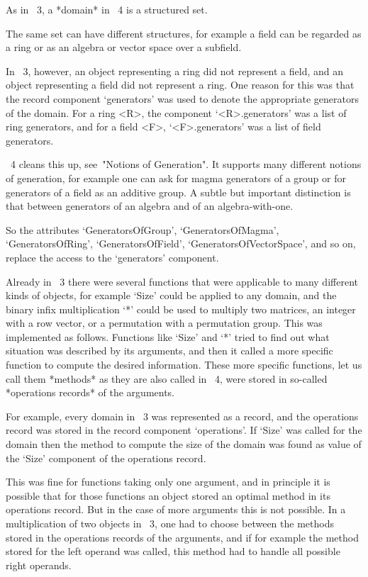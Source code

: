 As in {\GAP}~3, a *domain* in {\GAP}~4 is a structured set.

The same set can have different structures, for example a field can be
regarded as a ring or as an algebra or vector space over a subfield.

In {\GAP}~3, however, an object representing a ring did not represent
a field, and an object representing a field did not represent a ring.
One reason for this was that the record component `generators' was
used to denote the appropriate generators of the domain.  For a ring
<R>, the component `<R>.generators' was a list of ring generators, and
for a field <F>, `<F>.generators' was a list of field generators.

{\GAP}~4 cleans this up, see~"Notions of Generation".  It supports
many different notions of generation, for example one can ask for
magma generators of a group or for generators of a field as an additive
group.  A subtle but important distinction is that between generators
of an algebra and of an algebra-with-one.

So the attributes `GeneratorsOfGroup', `GeneratorsOfMagma',
`GeneratorsOfRing', `GeneratorsOfField', `GeneratorsOfVectorSpace',
and so on, replace the access to the `generators' component.



Already in {\GAP}~3 there were several functions that were applicable
to many different kinds of objects, for example `Size' could be
applied to any domain, and the binary infix multiplication `*' could
be used to multiply two matrices, an integer with a row vector, or a
permutation with a permutation group.  This was implemented as
follows.  Functions like `Size' and `*' tried to find out what
situation was described by its arguments, and then it called a more
specific function to compute the desired information.  These more
specific functions, let us call them *methods* as they are also called
in {\GAP}~4, were stored in so-called *operations records* of the
arguments.

For example, every domain in {\GAP}~3 was represented as a record, and
the operations record was stored in the record component `operations'.
If `Size' was called for the domain then the method to compute the
size of the domain was found as value of the `Size' component of the
operations record.

This was fine for functions taking only one argument, and in principle
it is possible that for those functions an object stored an optimal
method in its operations record.  But in the case of more arguments
this is not possible.  In a multiplication of two objects in {\GAP}~3,
one had to choose between the methods stored in the operations records
of the arguments, and if for example the method stored for the left
operand was called, this method had to handle all possible right
operands.

